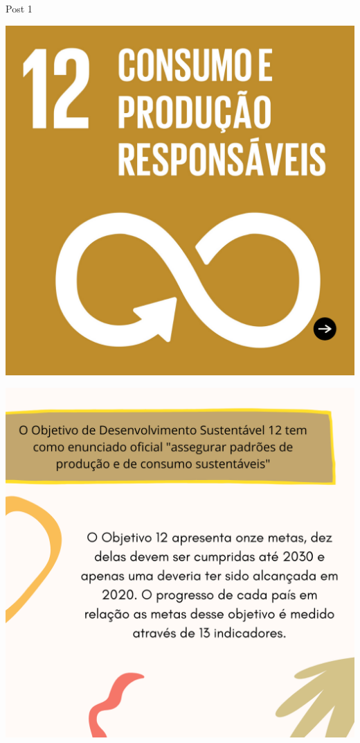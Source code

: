 \documentclass{beamer}
\begin{document}
	\begin{frame}{Post 1}
		\begin{minipage}{0.49\linewidth}
			\centering
			\includegraphics[width=\linewidth]{Post 1/1.png}
		\end{minipage}
		\hfill
		\begin{minipage}{0.49\linewidth}
			\centering
			\includegraphics[width=\linewidth]{Post 1/2.png}
		\end{minipage}
	\end{frame}
\end{document}
